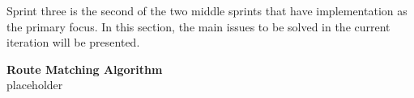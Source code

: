 Sprint three is the second of the two middle sprints that have implementation as the primary focus. In this section, the main issues to be solved in the current iteration will be presented.

\textbf{Route Matching Algorithm}\\
placeholder

